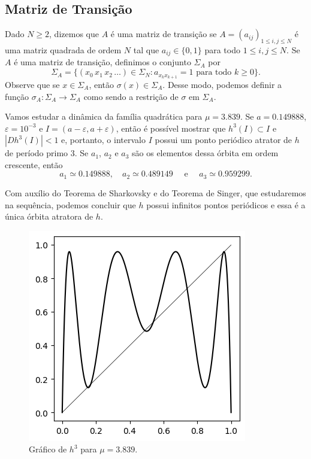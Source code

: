 \subsection{Matriz de Transição}

Dado $N \geq 2$, dizemos que $A$ é uma matriz de transição se $A = (a_{ij})_{1 \leq i,j \leq N}$ é uma matriz quadrada de ordem $N$ tal que $a_{ij} \in \lbrace 0, 1 \rbrace$ para todo $1 \leq i,j \leq N$.
Se $A$ é uma matriz de transição, definimos o conjunto $\Sigma_A$ por
$$\Sigma_A = \lbrace (x_0 \, x_1 \, x_2 \, \dots) \in \Sigma_N : a_{x_k x_{k+1}} = 1 \text{ para todo } k \geq 0 \rbrace.$$
Observe que se $x \in \Sigma_A$, então $\sigma(x) \in \Sigma_A$.
Desse modo, podemos definir a função $\sigma_A: \Sigma_A \to \Sigma_A$ como sendo a restrição de $\sigma$ em $\Sigma_A$.

Vamos estudar a dinâmica da família quadrática para $\mu = 3.839$.
Se $a = 0.149888$, $\varepsilon = 10^{-3}$ e $I = (a - \varepsilon, a + \varepsilon)$, então é possível mostrar que $h^3(I) \subset I$ e $|D h^3(I)| < 1$ e, portanto, o intervalo $I$ possui um ponto periódico atrator de $h$ de período primo $3$. Se $a_1$, $a_2$ e $a_3$ são os elementos dessa órbita em ordem crescente, então
$$a_1 \simeq 0.149888, \quad a_2 \simeq 0.489149 \quad \text{ e } \quad a_3 \simeq 0.959299.$$

Com auxílio do Teorema de Sharkovsky e do Teorema de Singer, que estudaremos na sequência, podemos concluir que $h$ possui infinitos pontos periódicos e essa é a única órbita atratora de $h$.

\begin{figure}[!htb]
\centering
\includegraphics[scale=0.6]{images/h_3,839.png}
\caption{Gráfico de $h^3$ para $\mu = 3.839$.}
\label{h_3,839}
\end{figure}

